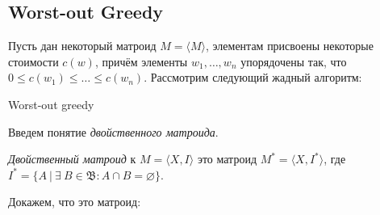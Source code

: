 \documentclass[a4paper, 12pt]{article}
\begin{document}
\subsection{Worst-out Greedy}

\begin{Lemma}
  Пусть дан некоторый матроид $M = \langle M \rangle$, элементам присвоены
  некоторые стоимости $c(w)$, причём элементы $w_1, \ldots, w_n$ упорядочены
  так, что $0 \leqslant c(w_1) \leqslant \ldots \leqslant c(w_n)$. Рассмотрим
  следующий жадный алгоритм:

  \begin{algorithm}
  \caption{Worst-out greedy}
    \begin{algorithmic}[1]
        \EndIf
      \EndFor
    \end{algorithmic}
\end{algorithm}
\end{Lemma}

  Введем понятие {\it двойственного матроида}.

{\it Двойственный матроид} к $M = \langle X, I \rangle$ это матроид $M^* = 
\langle X, I^*\rangle$, где $I^* = \{A \ | \ \exists \ B \in \mathfrak{B} : A
\cap B = \varnothing\}$.

Докажем, что это матроид:
\end{document}
